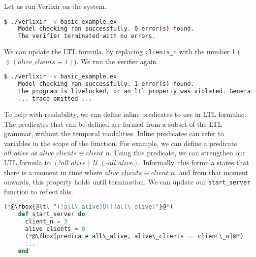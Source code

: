 Let us run Verlixir on the system.
\begin{lstlisting}[language=bash, xleftmargin=.3\linewidth]
    $ ./verlixir -v basic_example.ex
    Model checking ran successfully. 0 error(s) found.
    The verifier terminated with no errors.
\end{lstlisting}
We can update the LTL formula, by replacing \texttt{clients\_n} with the number 1 ($\lozenge (alive\_clients \equiv 1)$). We run the verifier again.
\begin{lstlisting}[language=bash, xleftmargin=.1\linewidth]
    $ ./verlixir -v basic_example.ex
    Model checking ran successfully. 1 error(s) found.
    The program is livelocked, or an ltl property was violated. Generating trace.
    ... trace omitted ...
\end{lstlisting}
To help with readability, we can define inline predicates to use in LTL formulae. The predicates that can be defined are formed from a subset of the LTL grammar, without the temporal modalities. Inline predicates can refer to variables in the scope of the function. For example, we can define a predicate \( all\_alive \) as $alive\_clients \equiv client\_n$. Using this predicate, we can strengthen our LTL formula to \( (!all\_alive) \ \mathcal{U} \ (\square all\_alive) \). Informally, this formula states that there is a moment in time where $alive\_clients \equiv client\_n$, and from that moment onwards, this property holds until termination. We can update our \texttt{start\_server} function to reflect this.
\begin{lstlisting}[language=Elixir, xleftmargin=.3\linewidth]
    (*@\fbox{@ltl "(!all\_alive)U([]all\_alive)"}@*)
    def start_server do
      client_n = 3
      alive_clients = 0
      (*@\fbox{predicate all\_alive, alive\_clients == client\_n}@*)
      ...
    end
\end{lstlisting}
